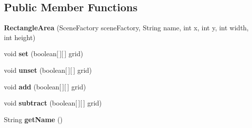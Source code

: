 \subsection*{Public Member Functions}
\begin{DoxyCompactItemize}
\item 
\hypertarget{classdev_1_1boxy_1_1fortyfive_1_1core_1_1areas_1_1_rectangle_area_a10f8d2fa6ae5866837b2f1465f3b5097}{
{\bfseries RectangleArea} (SceneFactory sceneFactory, String name, int x, int y, int width, int height)}
\label{d2/d2f/classdev_1_1boxy_1_1fortyfive_1_1core_1_1areas_1_1_rectangle_area_a10f8d2fa6ae5866837b2f1465f3b5097}

\item 
\hypertarget{classdev_1_1boxy_1_1fortyfive_1_1core_1_1areas_1_1_rectangle_area_a4e86e21a601c3ca20bdda1807498693e}{
void {\bfseries set} (boolean\mbox{[}$\,$\mbox{]}\mbox{[}$\,$\mbox{]} grid)}
\label{d2/d2f/classdev_1_1boxy_1_1fortyfive_1_1core_1_1areas_1_1_rectangle_area_a4e86e21a601c3ca20bdda1807498693e}

\item 
\hypertarget{classdev_1_1boxy_1_1fortyfive_1_1core_1_1areas_1_1_rectangle_area_afe09df71d656ee53c0275ca428a03663}{
void {\bfseries unset} (boolean\mbox{[}$\,$\mbox{]}\mbox{[}$\,$\mbox{]} grid)}
\label{d2/d2f/classdev_1_1boxy_1_1fortyfive_1_1core_1_1areas_1_1_rectangle_area_afe09df71d656ee53c0275ca428a03663}

\item 
\hypertarget{classdev_1_1boxy_1_1fortyfive_1_1core_1_1areas_1_1_rectangle_area_a9bfe080e8c286a54e94518de8d7be6e5}{
void {\bfseries add} (boolean\mbox{[}$\,$\mbox{]}\mbox{[}$\,$\mbox{]} grid)}
\label{d2/d2f/classdev_1_1boxy_1_1fortyfive_1_1core_1_1areas_1_1_rectangle_area_a9bfe080e8c286a54e94518de8d7be6e5}

\item 
\hypertarget{classdev_1_1boxy_1_1fortyfive_1_1core_1_1areas_1_1_rectangle_area_ad6036aab8a9270d3931da1e55361b655}{
void {\bfseries subtract} (boolean\mbox{[}$\,$\mbox{]}\mbox{[}$\,$\mbox{]} grid)}
\label{d2/d2f/classdev_1_1boxy_1_1fortyfive_1_1core_1_1areas_1_1_rectangle_area_ad6036aab8a9270d3931da1e55361b655}

\item 
\hypertarget{classdev_1_1boxy_1_1fortyfive_1_1core_1_1areas_1_1_rectangle_area_a45a9c6edb22ba026e001ffb5d2053bdf}{
String {\bfseries getName} ()}
\label{d2/d2f/classdev_1_1boxy_1_1fortyfive_1_1core_1_1areas_1_1_rectangle_area_a45a9c6edb22ba026e001ffb5d2053bdf}


\end{DoxyCompactItemize}
